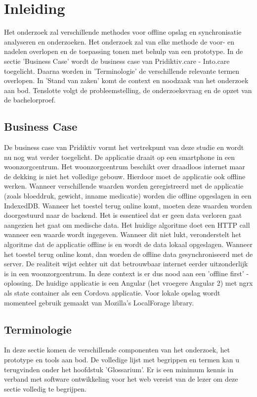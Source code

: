 \chapter{Inleiding}
\label{ch:inleiding}
Het onderzoek zal verschillende methodes voor offline opslag en synchronisatie analyseren en onderzoeken. Het onderzoek zal van elke methode de voor- en nadelen overlopen en de toepassing tonen met behulp van een prototype. In de sectie 'Business Case' wordt de business case van Pridiktiv.care - Into.care toegelicht. Daarna worden in 'Terminologie' de verschillende relevante termen overlopen. In 'Stand van zaken' komt de context en noodzaak van het onderzoek aan bod. Tenslotte volgt de probleemstelling, de onderzoeksvraag en de opzet van de bachelorproef.
\section{Business Case}
\label{sec:business-case}
De business case van Pridiktiv vormt het vertrekpunt van deze studie en wordt nu nog wat verder toegelicht. De applicatie draait op een smartphone in een woonzorgcentrum. Het woonzorgcentrum beschikt over draadloos internet maar de dekking is niet het volledige gebouw. Hierdoor moet de applicatie ook offline werken. Wanneer verschillende waarden worden geregistreerd met de applicatie (zoals bloeddruk, gewicht, inname medicatie) worden die offline opgeslagen in een IndexedDB. Wanneer het toestel terug online komt, moeten deze waarden worden doorgestuurd naar de backend. Het is essentieel dat er geen data verloren gaat aangezien het gaat om medische data. Het huidige algoritme doet een HTTP call wanneer een waarde wordt ingegeven. Wanneer dit niet lukt, veronderstelt het algoritme dat de applicatie offline is en wordt de data lokaal opgeslagen. Wanneer het toestel terug online komt, dan worden de offline data gesynchroniseerd met de server. De realiteit wijst echter uit dat betrouwbaar internet eerder uitzonderlijk is in een woonzorgcentrum. In deze context is er dus nood aan een 'offline first' -  oplossing. De huidige applicatie is een Angular (het vroegere Angular 2) met ngrx als state container als een Cordova applicatie. Voor lokale opslag wordt momenteel gebruik gemaakt van Mozilla's LocalForage library.
\section{Terminologie}
\label{sec:terminologie}
In deze sectie komen de verschillende componenten van het onderzoek, het prototype en tools aan bod. De volledige lijst met begrippen en termen kan u terugvinden onder het hoofdstuk 'Glossarium'. Er is een minimum kennis in verband met software ontwikkeling voor het web vereist van de lezer om deze sectie volledig te begrijpen.
